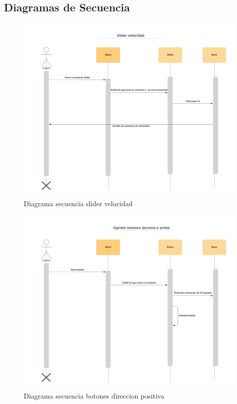 \documentclass[12pt]{article} %
\begin{document}
\subsection{Diagramas de Secuencia}
\begin{figure}  [!htb]
  \includegraphics[width=\linewidth]{Diagrama secuencia slider.png}
  \caption{Diagrama secuencia slider velocidad}
\end{figure}

\begin{figure}  [!htb]
  \includegraphics[width=\linewidth]{Diagrama secuencia oprimir botones 1.png}
  \caption{Diagrama secuencia botones direccion positiva}
\end{figure}
\end{document}
